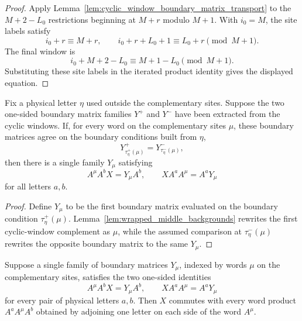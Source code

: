 \begin{proof}
    \leanok
    Apply Lemma~\ref{lem:cyclic_window_boundary_matrix_transport} to the
    $M+2-L_0$ restrictions beginning at $M+r$ modulo $M+1$. With $i_0=M$, the
    site labels satisfy
    \[
        i_0+r\equiv M+r,
        \qquad
        i_0+r+L_0+1\equiv L_0+r
        \pmod {M+1}.
    \]
    The final window is
    \[
        i_0+M+2-L_0\equiv M+1-L_0 \pmod {M+1}.
    \]
    Substituting these site labels in the iterated product identity gives the
    displayed equation.
\end{proof}

\begin{lemma}%
    \label{lem:two_sided_middle_of_wrapped_witness_comparison}
    \leanok
    Fix a physical letter $\eta$ used outside the complementary sites. Suppose
    the two one-sided boundary matrix families $Y^+$ and $Y^-$ have been
    extracted from the cyclic windows. If, for every word on the complementary sites
    $\mu$, these boundary matrices agree on the boundary conditions built from
    $\eta$,
    \[
        Y^+_{\tau^+_\eta(\mu)} = Y^-_{\tau^-_\eta(\mu)},
    \]
    then there is a single family $Y_\mu$ satisfying
    \[
        A^\mu A^b X = Y_\mu A^b,
        \qquad
        X A^a A^\mu = A^a Y_\mu
    \]
    for all letters $a,b$.
\end{lemma}

\begin{proof}
    \leanok
    Define $Y_\mu$ to be the first boundary matrix evaluated on the boundary
    condition
    $\tau^+_\eta(\mu)$. Lemma~\ref{lem:wrapped_middle_backgrounds} rewrites the
    first cyclic-window complement as $\mu$, while the assumed comparison at
    $\tau^-_\eta(\mu)$ rewrites the opposite boundary matrix to the same
    $Y_\mu$.
\end{proof}

\begin{lemma}%
    \label{lem:common_middle_same_witness_commutation}
    \leanok
    Suppose a single family of boundary matrices $Y_\mu$, indexed by words
    $\mu$ on the complementary sites, satisfies the two one-sided identities
    \begin{equation}\label{eq:ph_common_middle_one_sided}
        A^\mu A^b X = Y_\mu A^b,
        \qquad
        X A^a A^\mu = A^a Y_\mu
    \end{equation}
    for every pair of physical letters $a,b$. Then $X$ commutes with every word
    product $A^a A^\mu A^b$ obtained by adjoining one letter on each side of the
    word $A^\mu$.
\end{lemma}

